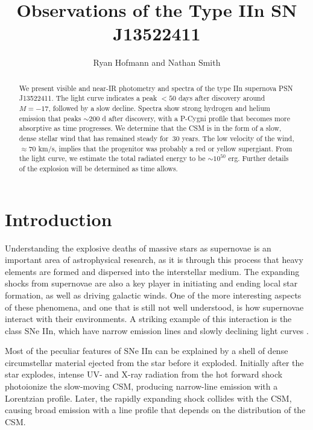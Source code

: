 \documentclass[iop]{emulateapj}
\begin{document}
\title{Observations of the Type IIn SN J13522411}

\author{Ryan Hofmann and Nathan Smith}

\begin{abstract}
We present visible and near-IR photometry and spectra of the type IIn supernova PSN J13522411. The light curve indicates a peak $<50$ days after discovery around $M = -17$, followed by a slow decline. Spectra show strong hydrogen and helium emission that peaks $\sim200$ d after discovery, with a P-Cygni profile that becomes more absorptive as time progresses. We determine that the CSM is in the form of a slow, dense stellar wind that has remained steady for $\>30$ years. The low velocity of the wind, $\approx70$ km/s, implies that the progenitor was probably a red or yellow supergiant. From the light curve, we estimate the total radiated energy to be $\sim10^{50}$ erg. Further details of the explosion will be determined as time allows.
\end{abstract}

\section{Introduction} \label{intro}
Understanding the explosive deaths of massive stars as supernovae is an important area of astrophysical research, as it is through this process that heavy elements are formed and dispersed into the interstellar medium. The expanding shocks from supernovae are also a key player in initiating and ending local star formation, as well as driving galactic winds. One of the more interesting aspects of these phenomena, and one that is still not well understood, is how supernovae interact with their environments. A striking example of this interaction is the class SNe IIn, which have narrow emission lines and slowly declining light curves \citep{Fil97}.

Most of the peculiar features of SNe IIn can be explained by a shell of dense circumstellar material ejected from the star before it exploded. Initially after the star explodes, intense UV- and X-ray radiation from the hot forward shock photoionize the slow-moving CSM, producing narrow-line emission with a Lorentzian profile. Later, the rapidly expanding shock collides with the CSM, causing broad emission with a line profile that depends on the distribution of the CSM.
\end{document}
